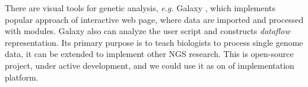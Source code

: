 \documentclass[a4paper]{jpconf}
\begin{document}

There are visual tools for genetic analysis, \emph{e.g.} Galaxy \cite{galaxy18}, which implements popular approach of interactive web page, where data are imported and processed with modules. Galaxy also can analyze the user script and constructs \emph{dataflow} representation. Its primary purpose is to teach biologists to process single genome data, it can be extended to implement other NGS research. This is open-source project, under active development, and we could use it as on of implementation platform. %
\end{document}
